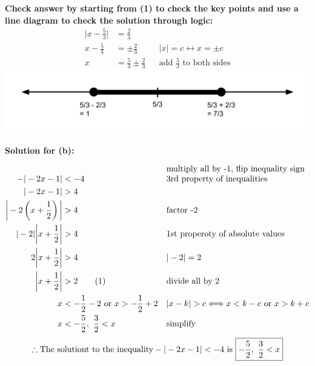 \documentclass[12pt]{book}
\newcommand\numberthis{\addtocounter{equation}{1}\tag{\theequation}}
\begin{document}
\begin{enumerate}
\vspace{0.5em}
\textbf{Check answer by starting from (1) to check the key points and use a line diagram to check the solution through logic:}
\vspace{0.2em}
\addtolength{\jot}{0em}
\begin{align*}
    \bigg|x - \frac{5}{3} \bigg| & = \frac{2}{3}\\
    x - \frac{5}{3} & = \pm \frac{2}{3} && |x| = c \longleftrightarrow x = \pm c\\
    x & = \frac{5}{3} \pm \frac{2}{3} && \text{add $\frac{5}{3}$ to both sides}
\end{align*}
\includegraphics[width=\linewidth]{A1-2 proof 1 (1).png}

\clearpage
\vspace{0.3cm} 
\textbf{Solution for (b):}
\vspace{-1.5em}

\addtolength{\jot}{0.3em}
\begin{align*}
    -|-2x-1| & < -4 && \text{\shortstack[l]{multiply all by -1, flip inequality sign \\ 3rd property of inequalities}} \\
    |-2x-1| & > 4 \\
    \bigg|-2 \left( x+\frac{1}{2} \right) \bigg| & > 4 && \text{factor -2} \\
    |-2|\bigg|x+\frac{1}{2}\bigg| & > 4 && \text{1st properoty of absolute values} \\
    2\bigg|x+\frac{1}{2}\bigg| & > 4 && |-2| = 2 \\
    \bigg|x+\frac{1}{2}\bigg| & > 2  \numberthis && \text{divide all by 2} \\
    x & < -\frac{1}{2} - 2 \text{ or } x > -\frac{1}{2} + 2 && |x-k| > c \Longleftrightarrow x < k-c \text{ or } x > k+c \\
    x & < -\frac{5}{2}, \text{\space} \frac{3}{2} < x && \text{simplify}
\end{align*}
$$ \therefore \text{The solutiont to the inequality} -|-2x-1| < -4 \text{ is } \boxed{-\frac{5}{2}, \text{\space} \frac{3}{2} < x} $$


\end{enumerate}
\end{document}
